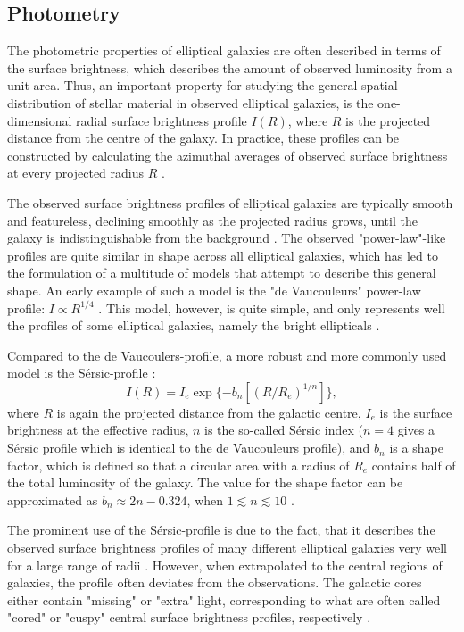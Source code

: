 \documentclass[english, oneside]{HYgradu}
\begin{document}
\subsection{Photometry} \label{section:ellip_photo}

The photometric properties of elliptical galaxies are often described in terms of the surface brightness, which describes the amount of observed luminosity from a unit area. Thus, an important property for studying the general spatial distribution of stellar material in observed elliptical galaxies, is the one-dimensional radial surface brightness profile $I(R)$, where $R$ is the projected distance from the centre of the galaxy. In practice, these profiles can be constructed by calculating the azimuthal averages of observed surface brightness at every projected radius $R$ \citep{MerrittBook}.

The observed surface brightness profiles of elliptical galaxies are typically smooth and featureless, declining smoothly as the projected radius grows, until the galaxy is indistinguishable from the background \citep{BinneyTremaine}. The observed "power-law"-like profiles are quite similar in shape across all elliptical galaxies, which has led to the formulation of a multitude of models that attempt to describe this general shape. An early example of such a model is the "de Vaucouleurs" power-law profile: $I \propto R^{1/4}$ \citep{deVaucouleurs1948}. This model, however, is quite simple, and only represents well the profiles of some elliptical galaxies, namely the bright ellipticals \citep{MerrittBook}. 

Compared to the de Vaucoulers-profile, a more robust and more commonly used model is the Sérsic-profile \citep{Sersic1968}:
\begin{equation}
I (R) = I_e \exp \{ -b_n \left[ (R / R_e)^{1/n} \right] \},
\end{equation}
where $R$ is again the projected distance from the galactic centre, $I_e$ is the surface brightness at the effective radius, $n$ is the so-called Sérsic index ($n=4$ gives a Sérsic profile which is identical to the de Vaucouleurs profile), and $b_n$ is a shape factor, which is defined so that a circular area with a radius of $R_e$ contains half of the total luminosity of the galaxy. The value for the shape factor can be approximated as $b_n \approx 2n - 0.324$, when $1 \lesssim n \lesssim 10$ \citep{BinneyTremaine}. 

The prominent use of the Sérsic-profile is due to the fact, that it describes the observed surface brightness profiles of many different elliptical galaxies very well for a large range of radii \citep{MerrittBook}. However, when extrapolated to the central regions of galaxies, the profile often deviates from the observations. The galactic cores either contain "missing" or "extra" light, corresponding to what are often called "cored" or "cuspy" central surface brightness profiles, respectively \citep[e.g.][]{Kormendy2009}.
\end{document}
